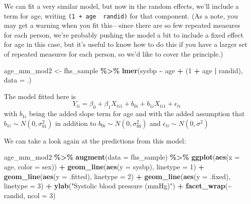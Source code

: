 \documentclass[
]{book}
\newenvironment{Shaded}{\begin{snugshade}}{\end{snugshade}}
\newcommand{\AttributeTok}[1]{\textcolor[rgb]{0.13,0.29,0.53}{#1}}
\newcommand{\DecValTok}[1]{\textcolor[rgb]{0.00,0.00,0.81}{#1}}
\newcommand{\FunctionTok}[1]{\textcolor[rgb]{0.13,0.29,0.53}{\textbf{#1}}}
\newcommand{\NormalTok}[1]{#1}
\newcommand{\OtherTok}[1]{\textcolor[rgb]{0.56,0.35,0.01}{#1}}
\newcommand{\SpecialCharTok}[1]{\textcolor[rgb]{0.81,0.36,0.00}{\textbf{#1}}}
\newcommand{\StringTok}[1]{\textcolor[rgb]{0.31,0.60,0.02}{#1}}
\begin{document}
We can fit a very similar model, but now in the random effects, we'll include
a term for age, writing \texttt{(1\ +\ age\ \textbar{}\ randid)} for that component. (As a note, you
may get a warning when you fit this---since there are so few repeated measures
for each person, we're probably pushing the model a bit to include a fixed
effect for age in this case, but it's useful to know how to do this if you
have a larger set of repeated measures for each person, so we'd like to
cover the principle.)

\begin{Shaded}
\begin{Highlighting}[]
\NormalTok{age\_mm\_mod2 }\OtherTok{\textless{}{-}}\NormalTok{ fhs\_sample }\SpecialCharTok{\%\textgreater{}\%} 
  \FunctionTok{lmer}\NormalTok{(sysbp }\SpecialCharTok{\textasciitilde{}}\NormalTok{ age }\SpecialCharTok{+}\NormalTok{ (}\DecValTok{1} \SpecialCharTok{+}\NormalTok{ age }\SpecialCharTok{|}\NormalTok{ randid), }\AttributeTok{data =}\NormalTok{ .) }
\end{Highlighting}
\end{Shaded}

The model fitted here is
\[
Y_{ti} = \beta_{0} + \beta_{1}X_{ti1} + b_{0i} + b_{1i}X_{ti1} + \epsilon_{ti}
\]
with \(b_{1i}\) being the added slope term for age and with the added assumption
that \(b_{1i} \sim N(0,\sigma_{b1}^2)\) in addition to \(b_{0i} \sim N(0,\sigma_{b0}^2)\)
and \(\epsilon_{ti} \sim N(0,\sigma^2)\)

We can take a look again at the predictions from this model:

\begin{Shaded}
\begin{Highlighting}[]
\NormalTok{age\_mm\_mod2 }\SpecialCharTok{\%\textgreater{}\%} 
  \FunctionTok{augment}\NormalTok{(}\AttributeTok{data =}\NormalTok{ fhs\_sample) }\SpecialCharTok{\%\textgreater{}\%} 
  \FunctionTok{ggplot}\NormalTok{(}\FunctionTok{aes}\NormalTok{(}\AttributeTok{x =}\NormalTok{ age, }\AttributeTok{color =}\NormalTok{ sex)) }\SpecialCharTok{+} 
  \FunctionTok{geom\_line}\NormalTok{(}\FunctionTok{aes}\NormalTok{(}\AttributeTok{y =}\NormalTok{ sysbp), }\AttributeTok{linetype =} \DecValTok{1}\NormalTok{) }\SpecialCharTok{+} 
  \FunctionTok{geom\_line}\NormalTok{(}\FunctionTok{aes}\NormalTok{(}\AttributeTok{y =}\NormalTok{ .fitted), }\AttributeTok{linetype =} \DecValTok{2}\NormalTok{) }\SpecialCharTok{+} 
  \FunctionTok{geom\_line}\NormalTok{(}\FunctionTok{aes}\NormalTok{(}\AttributeTok{y =}\NormalTok{ .fixed), }\AttributeTok{linetype =} \DecValTok{3}\NormalTok{) }\SpecialCharTok{+}
  \FunctionTok{ylab}\NormalTok{(}\StringTok{"Systolic blood pressure (mmHg)"}\NormalTok{) }\SpecialCharTok{+} 
  \FunctionTok{facet\_wrap}\NormalTok{(}\SpecialCharTok{\textasciitilde{}}\NormalTok{ randid, }\AttributeTok{ncol =} \DecValTok{3}\NormalTok{)}
\end{Highlighting}
\end{Shaded}
\end{document}
